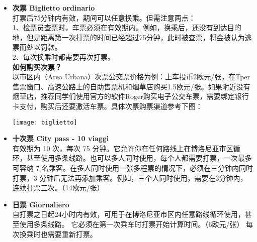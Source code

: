 \begin{itemize}
\item  \textbf{次票 Biglietto ordinario}\\
打票后75分钟内有效，期间可以任意换乘。但需注意两点：\\
1、检票员查票时，车票必须在有效期内。例如，换乘后，还没有到达目的地，但是距离第一次打票的时间已经超过75分钟，此时被查票，将会被认为逃票而处以罚款。\\
2、每次换乘时都需要再次打票。\\
\textbf{如何购买次票？}\\
以市区内（Area Urbana）次票公交票价格为例：上车投币2欧元/张，在Tper售票窗口、高速公路上的自助售票机和烟草店购买1.5欧元/张。如果附近没有烟草店，推荐同学们使用官方的软件Roger购买电子公交车票，需要绑定银行卡支付，购买后还要激活车票。具体次票购票渠道参考下图：

\texttt{[image: biglietto]}

\item  \textbf{十次票 City pass - 10 viaggi}\\
有效期为 10 次，每次 75 分钟。它允许你在任何路线上在博洛尼亚市区循环，甚至使用多条线路。也可以多人同时使用，每个人都需要打票，一次最多可容纳 7 名乘客。在多人同时使用一张多程票的情况下，必须在三分钟内同时打票，3 分钟后无法再添加乘客。例如，三个人同时使用，需要在3分钟内，连续打票三次。（14欧元/张）
\item  \textbf{日票 Giornaliero}\\
自打票之日起24小时内有效，可用于在博洛尼亚市区内任意路线循环使用，甚至使用多条线路。 它必须在第一次乘车时打票开始计算时间。（6欧元/张）
每次换乘时也需要重新打票。


\end{itemize}
